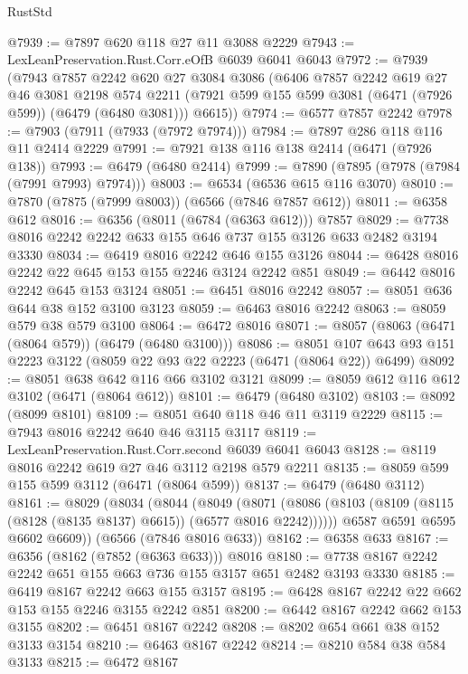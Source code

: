 \begin{lexlean}{RustStd}
\begin{coremodule}
{\begin{coremodule}
{{{{{{{{{{{{{{{{{{{{{{{{{{@7939 := @7897 @620 @118 @27 @11 @3088 @2229
@7943 := LexLeanPreservation.Rust.Corr.eOfB @6039 @6041 @6043
@7972 := @7939
    (@7943
      @7857
      @2242
      @620
      @27
      @3084
      @3086
      (@6406
        @7857
        @2242
        @619
        @27
        @46
        @3081
        @2198
        @574
        @2211
        (@7921 @599 @155 @599 @3081 (@6471 (@7926 @599)) (@6479 (@6480 @3081)))
        @6615))
@7974 := @6577 @7857 @2242
@7978 := @7903 (@7911 (@7933 (@7972 @7974)))
@7984 := @7897 @286 @118 @116 @11 @2414 @2229
@7991 := @7921 @138 @116 @138 @2414 (@6471 (@7926 @138))
@7993 := @6479 (@6480 @2414)
@7999 := @7890 (@7895 (@7978 (@7984 (@7991 @7993) @7974)))
@8003 := @6534 (@6536 @615 @116 @3070)
@8010 := @7870 (@7875 (@7999 @8003)) (@6566 (@7846 @7857 @612))
@8011 := @6358 @612
@8016 := @6356 (@8011 (@6784 (@6363 @612))) @7857
@8029 := @7738 @8016 @2242 @2242 @633 @155 @646 @737 @155 @3126 @633 @2482 @3194 @3330
@8034 := @6419 @8016 @2242 @646 @155 @3126
@8044 := @6428 @8016 @2242 @22 @645 @153 @155 @2246 @3124 @2242 @851
@8049 := @6442 @8016 @2242 @645 @153 @3124
@8051 := @6451 @8016 @2242
@8057 := @8051 @636 @644 @38 @152 @3100 @3123
@8059 := @6463 @8016 @2242
@8063 := @8059 @579 @38 @579 @3100
@8064 := @6472 @8016
@8071 := @8057 (@8063 (@6471 (@8064 @579)) (@6479 (@6480 @3100)))
@8086 := @8051 @107 @643 @93 @151 @2223 @3122 (@8059 @22 @93 @22 @2223 (@6471 (@8064 @22)) @6499)
@8092 := @8051 @638 @642 @116 @66 @3102 @3121
@8099 := @8059 @612 @116 @612 @3102 (@6471 (@8064 @612))
@8101 := @6479 (@6480 @3102)
@8103 := @8092 (@8099 @8101)
@8109 := @8051 @640 @118 @46 @11 @3119 @2229
@8115 := @7943 @8016 @2242 @640 @46 @3115 @3117
@8119 := LexLeanPreservation.Rust.Corr.second @6039 @6041 @6043
@8128 := @8119 @8016 @2242 @619 @27 @46 @3112 @2198 @579 @2211
@8135 := @8059 @599 @155 @599 @3112 (@6471 (@8064 @599))
@8137 := @6479 (@6480 @3112)
@8161 := @8029
    (@8034
      (@8044
        (@8049
          (@8071 (@8086 (@8103 (@8109 (@8115 (@8128 (@8135 @8137) @6615)) (@6577 @8016 @2242))))))
        @6587
        @6591
        @6595
        @6602
        @6609))
    (@6566 (@7846 @8016 @633))
@8162 := @6358 @633
@8167 := @6356 (@8162 (@7852 (@6363 @633))) @8016
@8180 := @7738 @8167 @2242 @2242 @651 @155 @663 @736 @155 @3157 @651 @2482 @3193 @3330
@8185 := @6419 @8167 @2242 @663 @155 @3157
@8195 := @6428 @8167 @2242 @22 @662 @153 @155 @2246 @3155 @2242 @851
@8200 := @6442 @8167 @2242 @662 @153 @3155
@8202 := @6451 @8167 @2242
@8208 := @8202 @654 @661 @38 @152 @3133 @3154
@8210 := @6463 @8167 @2242
@8214 := @8210 @584 @38 @584 @3133
@8215 := @6472 @8167
}}}}}}}}}}}}}}}}}}}}}}}}}}
\end{coremodule}}
\end{coremodule}
\end{lexlean}
